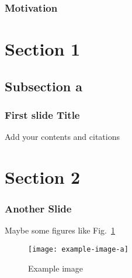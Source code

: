 \begin{frame}
\frametitle{Motivation}
\tableofcontents
\end{frame}

\section{Section 1}
\subsection{Subsection a}
\begin{frame}
    \frametitle{First slide Title}
    \small
    Add your contents and citations \citep{Tantau2016beamerguide}
\end{frame}
\section{Section 2}
\begin{frame}
    \frametitle{Another Slide}
    \small
    Maybe some figures like Fig.~\ref{fig:my_label}
    \begin{figure}
        \centering
        \texttt{[image: example-image-a]}
        \caption{Example image}
        \label{fig:my_label}
    \end{figure}
\end{frame}